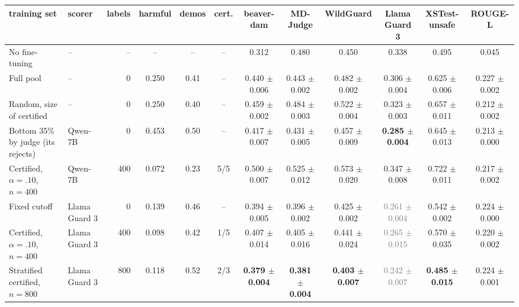 \begin{tabular}{llrccccccccc}
\toprule
training set & scorer & labels & harmful & demos & cert. & beaver-dam & MD-Judge & WildGuard & Llama Guard 3 & XSTest-unsafe & ROUGE-L \\
\midrule
No fine-tuning & -- & -- & -- & -- & -- & 0.312 & 0.480 & 0.450 & 0.338 & 0.495 & 0.045 \\
Full pool & -- & 0 & 0.250 & 0.41 & -- & 0.440 $\pm$ 0.006 & 0.443 $\pm$ 0.002 & 0.482 $\pm$ 0.002 & 0.306 $\pm$ 0.004 & 0.625 $\pm$ 0.006 & 0.227 $\pm$ 0.002 \\
Random, size of certified & -- & 0 & 0.250 & 0.40 & -- & 0.459 $\pm$ 0.002 & 0.484 $\pm$ 0.003 & 0.522 $\pm$ 0.004 & 0.323 $\pm$ 0.003 & 0.657 $\pm$ 0.011 & 0.212 $\pm$ 0.002 \\
Bottom 35\% by judge (its rejects) & Qwen-7B & 0 & 0.453 & 0.50 & -- & 0.417 $\pm$ 0.007 & 0.431 $\pm$ 0.005 & 0.457 $\pm$ 0.009 & \textbf{0.285 $\pm$ 0.004} & 0.645 $\pm$ 0.013 & 0.213 $\pm$ 0.000 \\
Certified, $\alpha{=}.10$, $n{=}400$ & Qwen-7B & 400 & 0.072 & 0.23 & 5/5 & 0.500 $\pm$ 0.007 & 0.525 $\pm$ 0.012 & 0.573 $\pm$ 0.020 & 0.347 $\pm$ 0.008 & 0.722 $\pm$ 0.011 & 0.217 $\pm$ 0.002 \\
Fixed cutoff & Llama Guard 3 & 0 & 0.139 & 0.46 & -- & 0.394 $\pm$ 0.005 & 0.396 $\pm$ 0.002 & 0.425 $\pm$ 0.002 & \textcolor{gray}{0.261 $\pm$ 0.004} & 0.542 $\pm$ 0.002 & 0.224 $\pm$ 0.000 \\
Certified, $\alpha{=}.10$, $n{=}400$ & Llama Guard 3 & 400 & 0.098 & 0.42 & 1/5 & 0.407 $\pm$ 0.014 & 0.405 $\pm$ 0.016 & 0.441 $\pm$ 0.024 & \textcolor{gray}{0.265 $\pm$ 0.015} & 0.570 $\pm$ 0.035 & 0.220 $\pm$ 0.002 \\
Stratified certified, $n{=}800$ & Llama Guard 3 & 800 & 0.118 & 0.52 & 2/3 & \textbf{0.379 $\pm$ 0.004} & \textbf{0.381 $\pm$ 0.004} & \textbf{0.403 $\pm$ 0.007} & \textcolor{gray}{0.242 $\pm$ 0.007} & \textbf{0.485 $\pm$ 0.015} & 0.224 $\pm$ 0.001 \\
\bottomrule
\end{tabular}
